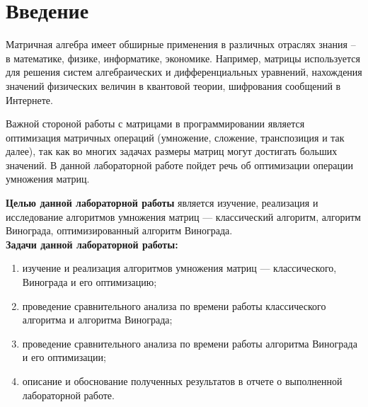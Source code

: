 \newpage
\chapter*{Введение}
Матричная алгебра имеет обширные применения в различных отраслях знания – в математике, физике, информатике, экономике. Например, матрицы используется для решения систем алгебраических и дифференциальных уравнений, нахождения значений физических величин в квантовой теории, шифрования сообщений в Интернете.

Важной стороной работы с матрицами в программировании является оптимизация матричных операций (умножение, сложение, транспозиция и так далее), так как во многих задачах размеры матриц могут достигать больших значений. 
В данной лабораторной работе пойдет речь об оптимизации операции умножения матриц.


\textbf{Целью данной лабораторной работы} является изучение, реализация и исследование алгоритмов умножения матриц --- классический алгоритм, алгоритм Винограда, оптимизированный алгоритм Винограда.\\

\textbf{Задачи данной лабораторной работы:}
\begin{enumerate}
	\item изучение и реализация алгоритмов умножения матриц --- классического, Винограда и его оптимизацию;
	\item проведение сравнительного анализа по времени работы классического алгоритма и алгоритма Винограда;
	\item проведение сравнительного анализа по времени работы алгоритма Винограда и его оптимизации;
	\item описание и обоснование полученных результатов в отчете о выполненной лабораторной работе.
\end{enumerate}

